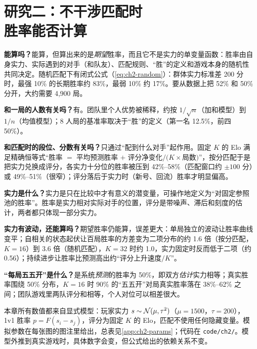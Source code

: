 \chapter[研究二：不干涉匹配时胜率能否计算]{研究二：不干涉匹配时\\胜率能否计算}
\label{ch:winrate}

\begin{answerbox}
\textbf{能算吗？}能算，但算出来的是\emph{期望}胜率，而且它不是实力的单变量函数：胜率由自身实力、实际遇到的对手（和队友）、匹配规则、“胜”的定义和游戏本身的随机性共同决定。随机匹配下有闭式公式（\cref{eq:ch2-random}）：群体实力标准差 200 分时，最强 10\% 的长期胜率约 83\%，最弱 10\% 约 17\%。要从数据上把 52\% 和 50\% 分开，大约需要 4,900 局。

\textbf{和一局的人数有关吗？}有。团队里个人优势被稀释，约按 $1/\sqrt n$（加和模型）到 $1/n$（均值模型）；8 人局的基准率取决于“胜”的定义（第一名 12.5\%，前四 50\%）。

\textbf{和匹配时的段位、分数有关吗？}只通过“配到什么对手”起作用。固定 $K$ 的 Elo 满足精确恒等式“胜率 $=$ 平均预测胜率 $+$ 评分净变化$/(K\times$局数$)$”，按分匹配于是把实力兑换成评分，各实力十分位的胜率被压到 42\%–58\%（匹配窗口约 $\pm100$ 分）或 49\%–51\%（很窄）；评分落后于实力时（新号、回流）胜率才明显偏高。

\textbf{实力是什么？}实力是只在比较中才有意义的潜变量，可操作地定义为“对固定参照池的胜率”。胜率是实力相对实际对手的位置，评分是带噪声、滞后和刻度的估计，两者都只体现一部分实力。

\textbf{实力有波动，还能算吗？}期望胜率仍能算，误差更大：单局独立的波动让胜率曲线变平；自相关的状态起伏让百局胜率的方差变为二项分布的约 1.6 倍（按分匹配，$K=16$）到 3.6 倍（随机匹配），$K=32$ 时约 1.0，实力固定时反而低于二项（约 0.56）；持续进步让胜率比预测高出约“评分上升速度$/K$”。

\textbf{“每局五五开”是什么？}是系统\emph{预测}的胜率为 50\%，即双方\emph{估计}实力相等；真实胜率围绕 50\% 分布，$K=16$ 时 90\% 的“五五开”对局真实胜率落在 38\%–62\% 之间；团队游戏里两队评分和相等，个人对位可以相差很大。
\end{answerbox}

本章所有数值都来自显式模型：玩家实力 $s\sim\mathcal{N}(\mu,\tau^2)$（$\mu=1500$，$\tau=200$），1v1 胜率 $p=F(s_i-s_j)$，评分为固定 $K$ 的 Elo，匹配不使用任何隐藏变量。模拟参数在每张图的图注里给出，总表见\cref{app:ch2-params}；代码在 \texttt{code/ch2/}。模型外推到真实游戏时，具体数字会变，但公式给出的依赖关系不变。

